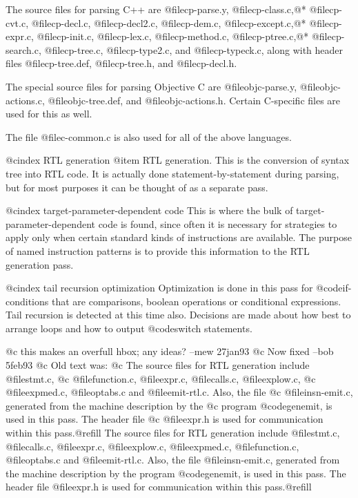 The source files for parsing C++ are @file{cp-parse.y},
@file{cp-class.c},@*
@file{cp-cvt.c}, @file{cp-decl.c}, @file{cp-decl2.c},
@file{cp-dem.c}, @file{cp-except.c},@*
@file{cp-expr.c}, @file{cp-init.c}, @file{cp-lex.c},
@file{cp-method.c}, @file{cp-ptree.c},@*
@file{cp-search.c}, @file{cp-tree.c}, @file{cp-type2.c}, and
@file{cp-typeck.c}, along with header files @file{cp-tree.def},
@file{cp-tree.h}, and @file{cp-decl.h}.

The special source files for parsing Objective C are
@file{objc-parse.y}, @file{objc-actions.c}, @file{objc-tree.def}, and
@file{objc-actions.h}.  Certain C-specific files are used for this as
well.

The file @file{c-common.c} is also used for all of the above languages.

@cindex RTL generation
@item
RTL generation.  This is the conversion of syntax tree into RTL code.
It is actually done statement-by-statement during parsing, but for
most purposes it can be thought of as a separate pass.

@cindex target-parameter-dependent code
This is where the bulk of target-parameter-dependent code is found,
since often it is necessary for strategies to apply only when certain
standard kinds of instructions are available.  The purpose of named
instruction patterns is to provide this information to the RTL
generation pass.

@cindex tail recursion optimization
Optimization is done in this pass for @code{if}-conditions that are
comparisons, boolean operations or conditional expressions.  Tail
recursion is detected at this time also.  Decisions are made about how
best to arrange loops and how to output @code{switch} statements.

@c this makes an overfull hbox; any ideas?  --mew 27jan93
@c Now fixed --bob 5feb93
@c Old text was:
@c The source files for RTL generation include @file{stmt.c},
@c @file{function.c}, @file{expr.c}, @file{calls.c}, @file{explow.c},
@c @file{expmed.c}, @file{optabs.c} and @file{emit-rtl.c}.  Also, the file
@c @file{insn-emit.c}, generated from the machine description by the
@c program @code{genemit}, is used in this pass.  The header file
@c @file{expr.h} is used for communication within this pass.@refill
The source files for RTL generation include 
@file{stmt.c},
@file{calls.c}, 
@file{expr.c}, 
@file{explow.c},
@file{expmed.c}, 
@file{function.c}, 
@file{optabs.c} 
and @file{emit-rtl.c}.  
Also, the file
@file{insn-emit.c}, generated from the machine description by the
program @code{genemit}, is used in this pass.  The header file
@file{expr.h} is used for communication within this pass.@refill


